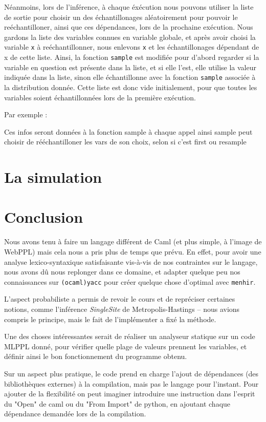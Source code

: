 \documentclass[svgnames]{article}
\begin{document}
Néanmoins, lors de l'inférence, à chaque éxécution nous pouvons utiliser la liste de sortie pour choisir un des échantillonages aléatoirement pour pouvoir le reéchantilloner, ainsi que ces dépendances, lors de la prochaine exécution. Nous gardons la liste des variables connues en variable globale, et après avoir choisi la variable \verb|x| à reéchantillonner, nous enlevons \verb|x| et les échantillonages dépendant de x de cette liste. Ainsi, la fonction \verb|sample| est modifiée pour d'abord regarder si la variable en question est présente dans la liste, et si elle l'est, elle utilise la valeur indiquée dans la liste, sinon elle échantillonne avec la fonction \verb|sample| associée à la distribution donnée. Cette liste est donc vide initialement, pour que toutes les variables soient échantillonnées lors de la première exécution.

Par exemple :


Ces infos seront données à la fonction sample à chaque appel
ainsi sample peut choisir de rééchantilloner les vars de son choix, selon si c'est first ou resample

\section{La simulation}

 

\section{Conclusion}
 

Nous avons tenu à faire un langage différent de Caml (et plus simple, à l'image de WebPPL) mais cela nous a pris plus de temps que prévu. En effet, pour avoir une analyse lexico-syntaxique satisfaisante vis-à-vis de nos contraintes sur le langage, nous avons dû nous replonger dans ce domaine, et adapter quelque peu nos connaissances sur  \verb|(ocaml)yacc| pour créer quelque chose d'optimal avec \verb|menhir|.

L'aspect probabiliste a permis de revoir le cours et de repréciser certaines notions, comme l'inférence \emph{SingleSite} de Metropolis-Hastings -- nous avions compris le principe, mais le fait de l'implémenter a fixé la méthode.

Une des choses intéressantes serait de réaliser un analyseur statique sur un code MLPPL donné, pour vérifier quelle plage de valeurs prennent les variables, et définir ainsi le bon fonctionnement du programme obtenu.

Sur un aspect plus pratique, le code prend en charge l'ajout de dépendances (des bibliothèques externes) à la compilation, mais pas le langage pour l'instant. Pour ajouter de la flexibilité on peut imaginer introduire une instruction dans l'esprit du "Open" de caml ou du "From Import" de python, en ajoutant chaque dépendance demandée lors de la compilation.
\end{document}

